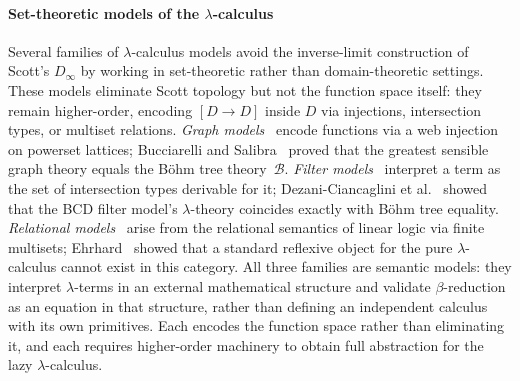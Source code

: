 \paragraph{Set-theoretic models of the $\lambda$-calculus}
Several families of $\lambda$-calculus models avoid the
inverse-limit construction of Scott's $D_\infty$ by working
in set-theoretic rather than domain-theoretic settings.
These models eliminate Scott topology but not the function
space itself: they remain higher-order, encoding $[D \to D]$
inside $D$ via injections, intersection types, or multiset
relations.
\emph{Graph models}~\cite{engeler1981-algebras-and-combinators,plotkin1993-set-theoretic-lambda-models}
encode functions via a web injection on powerset lattices;
Bucciarelli and Salibra~\cite{bucciarelli2008-graph-lambda-theories}
proved that the greatest sensible graph theory equals the
B\"ohm tree theory~$\mathcal{B}$.
\emph{Filter models}~\cite{barendregt1983-filter-lambda-model,coppo1978-intersection-type-assignment}
interpret a term as the set of intersection types derivable
for it;
Dezani-Ciancaglini et al.~\cite{dezani1998-intersection-types-bohm-trees}
showed that the BCD filter model's $\lambda$-theory
coincides exactly with B\"ohm tree equality.
\emph{Relational models}~\cite{ehrhard2005-finiteness-spaces,bucciarelli2001-phase-semantics-exponentials}
arise from the relational semantics of linear logic via
finite multisets;
Ehrhard~\cite{ehrhard2005-finiteness-spaces} showed that a standard
reflexive object for the pure $\lambda$-calculus cannot
exist in this category.
All three families are semantic models: they interpret
$\lambda$-terms in an external mathematical structure and
validate $\beta$-reduction as an equation in that structure,
rather than defining an independent calculus with its own
primitives.
Each encodes the function space rather than eliminating it,
and each requires higher-order machinery to obtain full
abstraction for the lazy $\lambda$-calculus.

